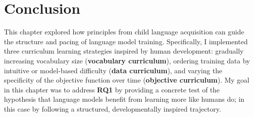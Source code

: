 



\section{Conclusion}
\label{sec:climb-conclusion}

This chapter explored how principles from child language acquisition can guide the structure and pacing of language model training. Specifically, I implemented three curriculum learning strategies inspired by human development: gradually increasing vocabulary size (\textbf{vocabulary curriculum}), ordering training data by intuitive or model-based difficulty (\textbf{data curriculum}), and varying the specificity of the objective function over time (\textbf{objective curriculum}). My goal in this chapter was to address \textbf{RQ1} by providing a concrete test of the hypothesis that language models benefit from learning more like humans do; in this case by following a structured, developmentally inspired trajectory.

